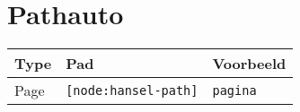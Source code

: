 \section{Pathauto}\label{paths}

\newcommand{\pathauto}[3]{
  \small{#1} & \small{\texttt{#2}} & \small{\texttt{#3}} \\ \hline
}

\begin{tabularx}{\linewidth}{|p{3cm}|p{5cm}|X|}
\hline
\rowcolor{tableheader}

\textbf{Type} & \textbf{Pad} & \textbf{Voorbeeld} \\ \hline

\pathauto{Page}{[node:hansel-path]}{pagina}
\end{tabularx}
